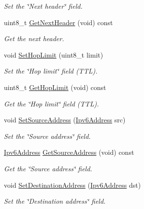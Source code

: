 \begin{DoxyCompactItemize}
\begin{DoxyCompactList}\small\item\em Set the \char`\"{}\+Next header\char`\"{} field. \end{DoxyCompactList}\item 
uint8\+\_\+t \hyperlink{classns3_1_1Ipv6Header_a24317958bbf0b77d2c1c6b23d1866e9b}{Get\+Next\+Header} (void) const 
\begin{DoxyCompactList}\small\item\em Get the next header. \end{DoxyCompactList}\item 
void \hyperlink{classns3_1_1Ipv6Header_a5133fdec9ec05d089d9c47f476715d73}{Set\+Hop\+Limit} (uint8\+\_\+t limit)
\begin{DoxyCompactList}\small\item\em Set the \char`\"{}\+Hop limit\char`\"{} field (T\+TL). \end{DoxyCompactList}\item 
uint8\+\_\+t \hyperlink{classns3_1_1Ipv6Header_adf9e577228bd7dca1e1192514b8ba8ab}{Get\+Hop\+Limit} (void) const 
\begin{DoxyCompactList}\small\item\em Get the \char`\"{}\+Hop limit\char`\"{} field (T\+TL). \end{DoxyCompactList}\item 
void \hyperlink{classns3_1_1Ipv6Header_aa0c5fe268a9a8096dfe9d4f7147241ab}{Set\+Source\+Address} (\hyperlink{classns3_1_1Ipv6Address}{Ipv6\+Address} src)
\begin{DoxyCompactList}\small\item\em Set the \char`\"{}\+Source address\char`\"{} field. \end{DoxyCompactList}\item 
\hyperlink{classns3_1_1Ipv6Address}{Ipv6\+Address} \hyperlink{classns3_1_1Ipv6Header_ae7b5116d81c8113fad228d799f5554c3}{Get\+Source\+Address} (void) const 
\begin{DoxyCompactList}\small\item\em Get the \char`\"{}\+Source address\char`\"{} field. \end{DoxyCompactList}\item 
void \hyperlink{classns3_1_1Ipv6Header_af42a4936f1f94fa012dfd33e3d5d9e9a}{Set\+Destination\+Address} (\hyperlink{classns3_1_1Ipv6Address}{Ipv6\+Address} dst)
\begin{DoxyCompactList}\small\item\em Set the \char`\"{}\+Destination address\char`\"{} field. \end{DoxyCompactList}\item 

\end{DoxyCompactItemize}
